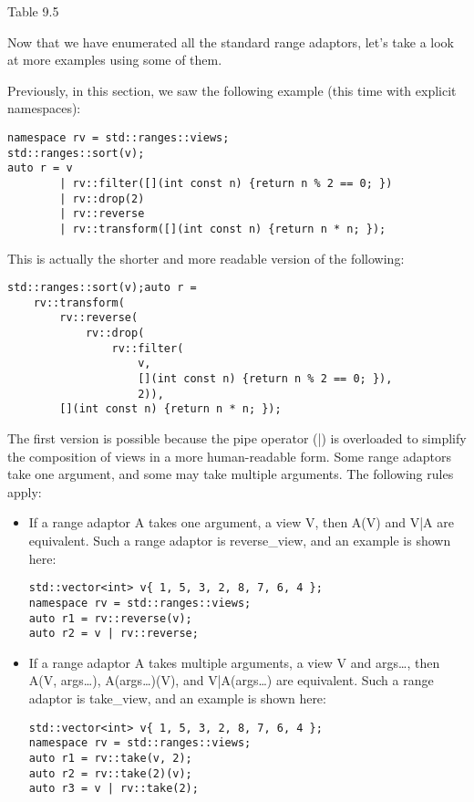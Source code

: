 \begin{center}
Table 9.5
\end{center}

Now that we have enumerated all the standard range adaptors, let’s take a look at more examples using some of them.


Previously, in this section, we saw the following example (this time with explicit namespaces):

\begin{lstlisting}[style=styleCXX]
namespace rv = std::ranges::views;
std::ranges::sort(v);
auto r = v
		| rv::filter([](int const n) {return n % 2 == 0; })
		| rv::drop(2)
		| rv::reverse
		| rv::transform([](int const n) {return n * n; });
\end{lstlisting}

This is actually the shorter and more readable version of the following:

\begin{lstlisting}[style=styleCXX]
std::ranges::sort(v);auto r =
	rv::transform(
		rv::reverse(
			rv::drop(
				rv::filter(
					v,
					[](int const n) {return n % 2 == 0; }),
					2)),
		[](int const n) {return n * n; });
\end{lstlisting}

The first version is possible because the pipe operator (|) is overloaded to simplify the composition of views in a more human-readable form. Some range adaptors take one argument, and some may take multiple arguments. The following rules apply:

\begin{itemize}
\item
If a range adaptor A takes one argument, a view V, then A(V) and V|A are equivalent. Such a range adaptor is reverse\_view, and an example is shown here:

\begin{lstlisting}[style=styleCXX]
std::vector<int> v{ 1, 5, 3, 2, 8, 7, 6, 4 };
namespace rv = std::ranges::views;
auto r1 = rv::reverse(v);
auto r2 = v | rv::reverse;
\end{lstlisting}

\item
If a range adaptor A takes multiple arguments, a view V and args…, then A(V, args…), A(args…)(V), and V|A(args…) are equivalent. Such a range adaptor is take\_view, and an example is shown here:

\begin{lstlisting}[style=styleCXX]
std::vector<int> v{ 1, 5, 3, 2, 8, 7, 6, 4 };
namespace rv = std::ranges::views;
auto r1 = rv::take(v, 2);
auto r2 = rv::take(2)(v);
auto r3 = v | rv::take(2);
\end{lstlisting}

\end{itemize}

